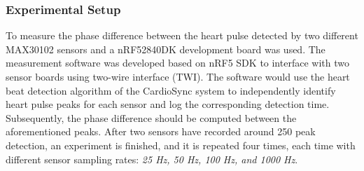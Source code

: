 \subsubsection{Experimental Setup}
To measure the phase difference between the heart pulse detected by two different MAX30102 sensors and a nRF52840DK development board \cite{nRF52840} was used. The measurement software was developed based on nRF5 SDK \cite{2023nRF5} to interface with two sensor boards using two-wire interface (TWI).  The software would use the heart beat detection algorithm of the CardioSync system to independently identify heart pulse peaks for each sensor and log the corresponding detection time. Subsequently, the phase difference should be computed between the aforementioned peaks. After two sensors have recorded around 250 peak detection, an experiment is finished, and it is repeated four times, each time with different sensor sampling rates: \textit{25 Hz, 50 Hz, 100 Hz, and 1000 Hz}.

